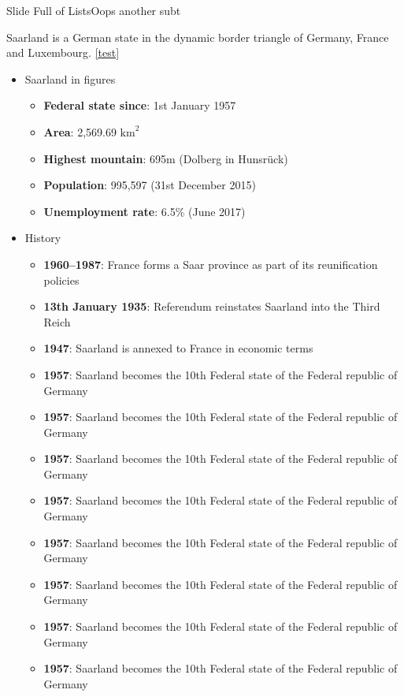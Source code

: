 \documentclass{\FormatDir corpborepresMulti}
\begin{document}
	\begin{frame}[allowframebreaks]{Slide Full of Lists}{Oops another subt}


	Saarland is a German state in the dynamic border triangle of Germany, France and Luxembourg.
	\cref{test}
		\begin{itemize}
			\item Saarland in figures
				\begin{itemize}
					\item \textbf{Federal state since}: 1st January 1957
					\item \textbf{Area}: 2,569.69 $\text{km}^2$
					\item \textbf{Highest mountain}: 695m (Dolberg in Hunsrück)
					\item \textbf{Population}: 995,597 (31st December 2015)
					\item \textbf{Unemployment rate}: 6.5\% (June 2017)
				\end{itemize}
			\item History
				\begin{itemize}
					\item \textbf{1960--1987}: France forms a Saar province as part of its reunification policies
					\item \textbf{13th January 1935}: Referendum reinstates Saarland into the Third Reich
					\item \textbf{1947}: Saarland is annexed to France in economic terms
					\item \textbf{1957}: Saarland becomes the 10th Federal state of the Federal republic of Germany
					\item \textbf{1957}: Saarland becomes the 10th Federal state of the Federal republic of Germany
					\item \textbf{1957}: Saarland becomes the 10th Federal state of the Federal republic of Germany
					\item \textbf{1957}: Saarland becomes the 10th Federal state of the Federal republic of Germany
					\item \textbf{1957}: Saarland becomes the 10th Federal state of the Federal republic of Germany
					\item \textbf{1957}: Saarland becomes the 10th Federal state of the Federal republic of Germany
					\item \textbf{1957}: Saarland becomes the 10th Federal state of the Federal republic of Germany
					\item \textbf{1957}: Saarland becomes the 10th Federal state of the Federal republic of Germany

\end{itemize}
\end{itemize}
\end{frame}
\end{document}

